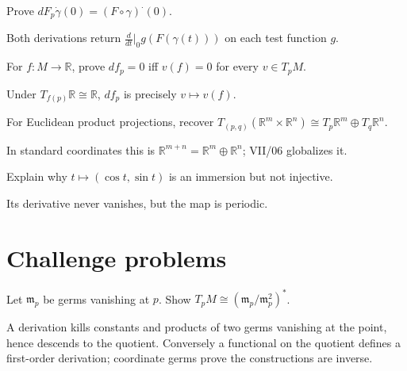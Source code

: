 \begin{problem}\label{prob:vii04-09}
Prove \(dF_p\dot\gamma(0)=(F\circ\gamma)^{\boldsymbol\cdot}(0)\).
\end{problem}
\begin{solution}
Both derivations return \(\frac d{dt}|_0g(F(\gamma(t)))\) on each test function \(g\).
\end{solution}

\begin{problem}\label{prob:vii04-10}
For \(f:M\to\mathbb R\), prove \(df_p=0\) iff \(v(f)=0\) for every \(v\in T_pM\).
\end{problem}
\begin{solution}
Under \(T_{f(p)}\mathbb R\cong\mathbb R\), \(df_p\) is precisely \(v\mapsto v(f)\).
\end{solution}

\begin{problem}\label{prob:vii04-11}
For Euclidean product projections, recover \(T_{(p,q)}(\mathbb R^m\times\mathbb R^n)\cong T_p\mathbb R^m\oplus T_q\mathbb R^n\).
\end{problem}
\begin{solution}
In standard coordinates this is \(\mathbb R^{m+n}=\mathbb R^m\oplus\mathbb R^n\); VII/06 globalizes it.
\end{solution}

\begin{problem}\label{prob:vii04-12}
Explain why \(t\mapsto(\cos t,\sin t)\) is an immersion but not injective.
\end{problem}
\begin{solution}
Its derivative never vanishes, but the map is periodic.
\end{solution}

\section{Challenge problems}
\begin{problem}\label{prob:vii04-ch01}
Let \(\mathfrak m_p\) be germs vanishing at \(p\). Show \(T_pM\cong(\mathfrak m_p/\mathfrak m_p^2)^*\).
\end{problem}
\begin{solution}
A derivation kills constants and products of two germs vanishing at the point, hence descends to the quotient. Conversely a functional on the quotient defines a first-order derivation; coordinate germs prove the constructions are inverse.
\end{solution}

